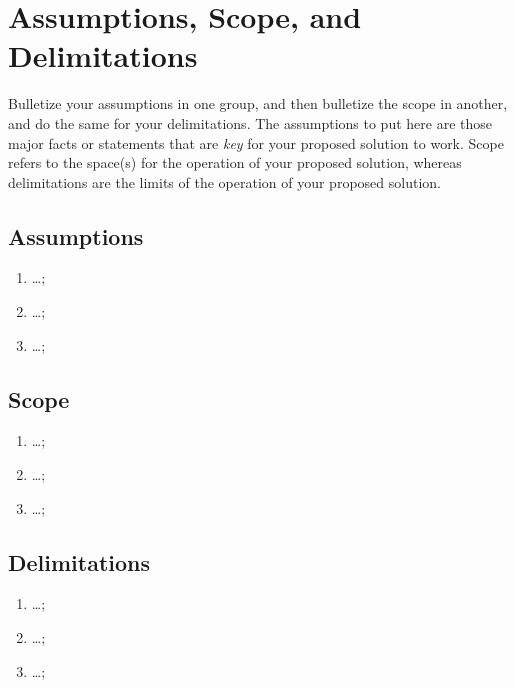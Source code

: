 


\section{Assumptions, Scope, and Delimitations}

Bulletize your assumptions in one group, and then bulletize the scope in another, and do the same for your delimitations. The assumptions to put here are those major facts or statements that are \textit{key} for your proposed solution to work. Scope refers to the space(s) for the operation of your proposed solution, whereas delimitations are the limits of the operation of your proposed solution.

\subsection{Assumptions}

\begin{enumerate}
	\item \ldots;
	
	\item \ldots;
	
	\item \ldots;	
\end{enumerate}

\subsection{Scope}
\begin{enumerate}
	\item \ldots;
	
	\item \ldots;
	
	\item \ldots;	
\end{enumerate}

\subsection{Delimitations}
\begin{enumerate}
	\item \ldots;
	
	\item \ldots;
	
	\item \ldots;	
\end{enumerate}

